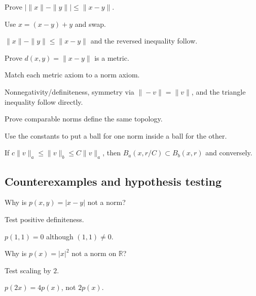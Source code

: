 \begin{exercise}\label{exr:ii02-expand-07}
Prove \(|\|x\|-\|y\||\le\|x-y\|\).
\end{exercise}
\begin{hint}
Use \(x=(x-y)+y\) and swap.
\end{hint}
\begin{solution}
\(\|x\|-\|y\|\le\|x-y\|\) and the reversed inequality follow.
\end{solution}

\begin{exercise}\label{exr:ii02-expand-08}
Prove \(d(x,y)=\|x-y\|\) is a metric.
\end{exercise}
\begin{hint}
Match each metric axiom to a norm axiom.
\end{hint}
\begin{solution}
Nonnegativity/definiteness, symmetry via \(\|-v\|=\|v\|\), and the triangle inequality follow directly.
\end{solution}

\begin{exercise}\label{exr:ii02-expand-09}
Prove comparable norms define the same topology.
\end{exercise}
\begin{hint}
Use the constants to put a ball for one norm inside a ball for the other.
\end{hint}
\begin{solution}
If \(c\|v\|_a\le\|v\|_b\le C\|v\|_a\), then \(B_a(x,r/C)\subset B_b(x,r)\) and conversely.
\end{solution}

\subsection*{Counterexamples and hypothesis testing}

\begin{exercise}[Seminorm]\label{exr:ii02-expand-10}
Why is \(p(x,y)=|x-y|\) not a norm?
\end{exercise}
\begin{hint}
Test positive definiteness.
\end{hint}
\begin{solution}
\(p(1,1)=0\) although \((1,1)\ne0\).
\end{solution}

\begin{exercise}\label{exr:ii02-expand-11}
Why is \(p(x)=|x|^2\) not a norm on \(\mathbb R\)?
\end{exercise}
\begin{hint}
Test scaling by \(2\).
\end{hint}
\begin{solution}
\(p(2x)=4p(x)\), not \(2p(x)\).
\end{solution}

